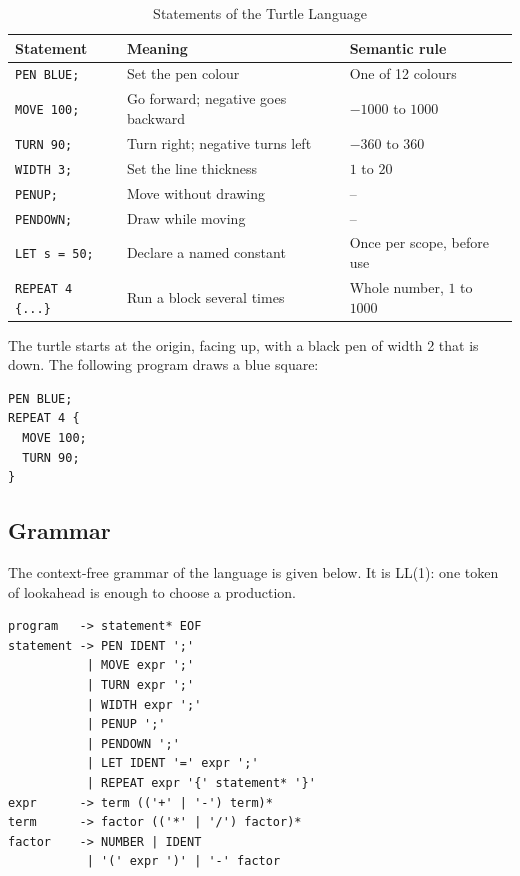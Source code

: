 \documentclass[conference]{IEEEtran}
\newcommand{\kw}[1]{\texttt{#1}}
\begin{document}
\begin{table}[htbp]
\caption{Statements of the Turtle Language}
\label{tab:stmts}
\centering
\footnotesize
\begin{tabularx}{\columnwidth}{@{}l>{\raggedright\arraybackslash}X>{\raggedright\arraybackslash}p{2.3cm}@{}}
\toprule
Statement & Meaning & Semantic rule\\
\midrule
\kw{PEN BLUE;} & Set the pen colour & One of 12 colours\\
\kw{MOVE 100;} & Go forward; negative goes backward & $-1000$ to $1000$\\
\kw{TURN 90;} & Turn right; negative turns left & $-360$ to $360$\\
\kw{WIDTH 3;} & Set the line thickness & $1$ to $20$\\
\kw{PENUP;} & Move without drawing & --\\
\kw{PENDOWN;} & Draw while moving & --\\
\kw{LET s = 50;} & Declare a named constant & Once per scope, before use\\
\kw{REPEAT 4 \{...\}} & Run a block several times & Whole number, $1$ to $1000$\\
\bottomrule
\end{tabularx}
\end{table}

The turtle starts at the origin, facing up, with a black pen of width 2 that is down. The following program draws a blue square:

\begin{verbatim}
PEN BLUE;
REPEAT 4 {
  MOVE 100;
  TURN 90;
}
\end{verbatim}

\subsection{Grammar}
The context-free grammar of the language is given below. It is LL(1): one token of lookahead is enough to choose a production.

{\footnotesize
\begin{verbatim}
program   -> statement* EOF
statement -> PEN IDENT ';'
           | MOVE expr ';'
           | TURN expr ';'
           | WIDTH expr ';'
           | PENUP ';'
           | PENDOWN ';'
           | LET IDENT '=' expr ';'
           | REPEAT expr '{' statement* '}'
expr      -> term (('+' | '-') term)*
term      -> factor (('*' | '/') factor)*
factor    -> NUMBER | IDENT
           | '(' expr ')' | '-' factor
\end{verbatim}
}
\end{document}
